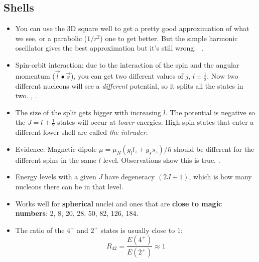 \documentclass[letter]{article}
\begin{document}
\subsection{Shells}
\begin{itemize}
\item You can use the 3D square well to get a pretty good
  approximation of what we see, or a parabolic ($1/r^2$) one to get
  better. But the simple harmonic oscillator gives the best
  approximation but it's still wrong. ~\cite[Lec. 12]{lecture}.
\item Spin-orbit interaction: due to the interaction of the spin and
  the angular momentum ($\vec{l}\bullet\vec{s}$), you can get two
  different values of $j$, $l \pm \frac{1}{2}$. Now two different
  nucleons will see a \textit{different} potential, so it splits all
  the states in two. \cite[Lec. 13-16]{lecture},
  \cite[pp. 123-125]{krane}.
\item The size of the split gets bigger with increasing $l$. The
  potential is negative so the $J=l+\frac{1}{2}$ states will occur at
  \textit{lower} energies. High spin states that enter a different lower shell are called \textit{the
  intruder}. \cite[Lec. 13-16]{lecture}
\item Evidence: Magnetic dipole $\mu=\mu_N(g_ll_z + g_ss_z)/\hbar$
  should be different for the different spins in the same $l$
  level. Observations show this is true. \cite[Lec. 13-16]{lecture}.
\item Energy levels with a given $J$ have degeneracy $(2J+1)$, which
  is how many nucleons there can be in that level.
\item Works well for \textbf{spherical} nuclei and ones that are
  \textbf{close to magic numbers}: 2, 8, 20, 28, 50, 82, 126, 184.
\item The ratio of the $4^+$ and $2^+$ states is usually close to 1:
  \begin{equation*}
    R_{42}=\frac{E(4^+)}{E(2^+)} \approx 1
  \end{equation*}
\end{itemize}
\end{document}
